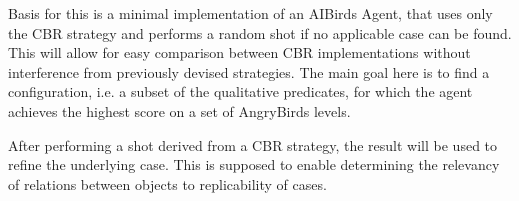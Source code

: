 Basis for this is a minimal implementation of an AIBirds Agent, that uses only the CBR strategy and performs a random
shot if no applicable case can be found.
This will allow for easy comparison between CBR implementations without interference from previously devised strategies.
The main goal here is to find a configuration, i.e. a subset of the qualitative predicates, for which the agent achieves the highest score on a set of AngryBirds levels.

After performing a shot derived from a CBR strategy, the result will be used to refine the underlying case.
This is supposed to enable determining the relevancy of relations between objects to replicability of cases.

